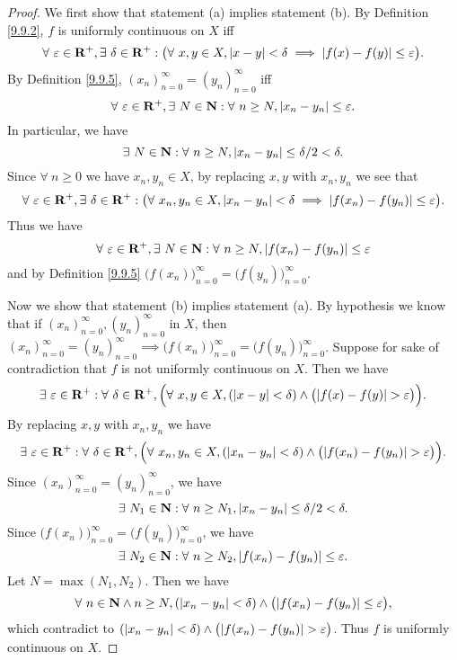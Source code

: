 \begin{proof}
    We first show that statement (a) implies statement (b).
    By Definition \ref{9.9.2}, \(f\) is uniformly continuous on \(X\) iff
    \[
        \forall\ \varepsilon \in \mathbf{R}^+, \exists\ \delta \in \mathbf{R}^+ : \big(\forall\ x, y \in X, \abs*{x - y} < \delta \implies \abs*{f(x) - f(y)} \leq \varepsilon\big).
    \]
    By Definition \ref{9.9.5}, \((x_n)_{n = 0}^\infty = (y_n)_{n = 0}^\infty\) iff
    \[
        \forall\ \varepsilon \in \mathbf{R}^+, \exists\ N \in \mathbf{N} : \forall\ n \geq N, \abs*{x_n - y_n} \leq \varepsilon.
    \]
    In particular, we have
    \[
        \exists\ N \in \mathbf{N} : \forall\ n \geq N, \abs*{x_n - y_n} \leq \delta / 2 < \delta.
    \]
    Since \(\forall\ n \geq 0\) we have \(x_n, y_n \in X\), by replacing \(x, y\) with \(x_n, y_n\) we see that
    \[
        \forall\ \varepsilon \in \mathbf{R}^+, \exists\ \delta \in \mathbf{R}^+ : \big(\forall\ x_n, y_n \in X, \abs*{x_n - y_n} < \delta \implies \abs*{f(x_n) - f(y_n)} \leq \varepsilon\big).
    \]
    Thus we have
    \[
        \forall\ \varepsilon \in \mathbf{R}^+, \exists\ N \in \mathbf{N} : \forall\ n \geq N, \abs*{f(x_n) - f(y_n)} \leq \varepsilon
    \]
    and by Definition \ref{9.9.5} \(\big(f(x_n)\big)_{n = 0}^\infty = \big(f(y_n)\big)_{n = 0}^\infty\).

    Now we show that statement (b) implies statement (a).
    By hypothesis we know that if \((x_n)_{n = 0}^\infty, (y_n)_{n = 0}^\infty\) in \(X\), then \((x_n)_{n = 0}^\infty = (y_n)_{n = 0}^\infty \implies \big(f(x_n)\big)_{n = 0}^\infty = \big(f(y_n)\big)_{n = 0}^\infty\).
    Suppose for sake of contradiction that \(f\) is not uniformly continuous on \(X\).
    Then we have
    \[
        \exists\ \varepsilon \in \mathbf{R}^+ : \forall\ \delta \in \mathbf{R}^+, \Big(\forall\ x, y \in X, (\abs*{x - y} < \delta) \land \big(\abs*{f(x) - f(y)} > \varepsilon\big)\Big).
    \]
    By replacing \(x, y\) with \(x_n, y_n\) we have
    \[
        \exists\ \varepsilon \in \mathbf{R}^+ : \forall\ \delta \in \mathbf{R}^+, \Big(\forall\ x_n, y_n \in X, (\abs*{x_n - y_n} < \delta) \land \big(\abs*{f(x_n) - f(y_n)} > \varepsilon\big)\Big).
    \]
    Since \((x_n)_{n = 0}^\infty = (y_n)_{n = 0}^\infty\), we have
    \[
        \exists\ N_1 \in \mathbf{N} : \forall\ n \geq N_1, \abs*{x_n - y_n} \leq \delta / 2 < \delta.
    \]
    Since \(\big(f(x_n)\big)_{n = 0}^\infty = \big(f(y_n)\big)_{n = 0}^\infty\), we have
    \[
        \exists\ N_2 \in \mathbf{N} : \forall\ n \geq N_2, \abs*{f(x_n) - f(y_n)} \leq \varepsilon.
    \]
    Let \(N = \max(N_1, N_2)\).
    Then we have
    \[
        \forall\ n \in \mathbf{N} \land n \geq N, (\abs*{x_n - y_n} < \delta) \land \big(\abs*{f(x_n) - f(y_n)} \leq \varepsilon\big),
    \]
    which contradict to \((\abs*{x_n - y_n} < \delta) \land \big(\abs*{f(x_n) - f(y_n)} > \varepsilon\big)\).
    Thus \(f\) is uniformly continuous on \(X\).
\end{proof}

